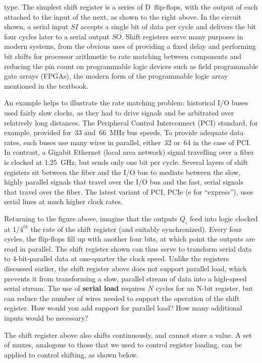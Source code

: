 type.  The simplest shift register is a series of D~flip-flops,
with the output of each attached to the input of the next, as shown to the
right above.  In the circuit shown, a serial input $SI$ accepts a single bit 
of data per cycle and delivers the bit four cycles later to a serial 
output $SO$.  Shift registers serve many purposes in modern systems, from the
obvious uses of providing a fixed delay and performing bit shifts for
processor arithmetic to rate matching between components and reducing
the pin count on programmable logic devices such as field programmable
gate arrays (FPGAs), the modern form of the programmable logic array
mentioned in the textbook.

An example helps to illustrate the rate matching problem: 
historical I/O buses used fairly slow clocks, as they had to
drive signals and be arbitrated over relatively long distances.
The Peripheral Control
Interconnect (PCI) standard, for example, provided for~33 and~66~MHz
bus speeds.  To provide adequate data rates, such buses use many wires
in parallel, either~32 or~64 in the case of PCI.  In contrast, a
Gigabit Ethernet (local area network) signal travelling over a fiber
is clocked at 1.25~GHz, but sends only one bit per cycle.  Several
layers of shift registers sit between the fiber and the I/O bus to
mediate between the slow, highly parallel signals that travel over the
I/O bus and the fast, serial signals that travel over the 
fiber.  The latest variant of PCI, PCIe (e for ``express''),
uses serial lines at much higher clock rates.

Returning to the figure above, imagine that the outputs $Q_i$ feed
into logic clocked at $1/4^{th}$ the rate of the shift register 
(and suitably synchronized).  Every four cycles, the flip-flops fill
up with another four bits, at which point the outputs are read in
parallel.  The shift register shown can thus serve to transform serial
data to \mbox{4-bit-parallel} data at one-quarter the clock speed.
Unlike the registers discussed earlier, the shift register above does
not support parallel load, which prevents it from transforming a slow,
parallel stream of data into a high-speed serial stream.  The use of
{\bf serial load} requires $N$ cycles for an \mbox{N-bit}
register, but can reduce the number of wires needed to support the
operation of the shift register.  How would you add support for
parallel load?  How many additional inputs would be necessary?

The shift register above also shifts continuously, and cannot store a 
value.  A set of muxes, analogous to those that we used to control 
register loading, can be applied to control shifting, as shown 
below.\\

